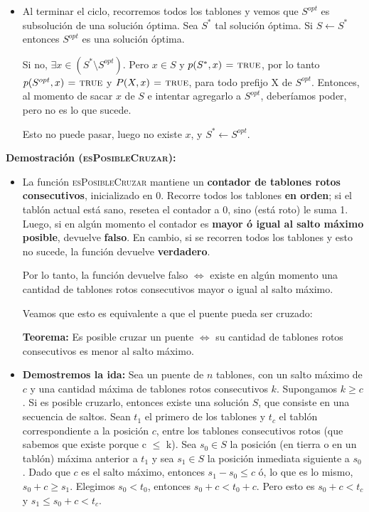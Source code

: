 \begin{itemize}
\begin{itemize}
    \item Al terminar el ciclo, recorremos todos los tablones y vemos que $S^{opt}$
    es subsolución de una solución óptima. Sea $S^{*}$ tal solución óptima.
    Si $S \gets S^{*}$ entonces $S^{opt}$ es una solución óptima.

    Si no, $\exists x \in (S^{*} \setminus S^{opt})$. Pero $x \in S$ y $p(S^{*}, x) \mathrel{\hspace{1pt}=\hspace{1pt}} \textnormal{\scshape true}$,
    por lo tanto $p(S^{opt}, x) \mathrel{\hspace{1pt}=\hspace{1pt}} \textnormal{\scshape true}$ y $P(X, x) \mathrel{\hspace{1pt}=\hspace{1pt}} \textnormal{\scshape true}$, para todo prefijo
    X de $S^{opt}$. Entonces, al momento de sacar $x$ de $S$ e intentar agregarlo a $S^{opt}$,
    deberíamos poder, pero no es lo que sucede.

    Esto no puede pasar, luego no existe $x$, y $S^{*} \gets S^{opt}$.

  \end{itemize}

\newpage

\textbf{Demostración (\textsc{esPosibleCruzar}):}
\begin{itemize}
\item La función \textsc{esPosibleCruzar} mantiene un \textbf{contador de tablones rotos consecutivos},
inicializado en 0. Recorre todos los tablones \textbf{en orden}; si el tablón actual
está sano, resetea el contador a 0, sino (está roto) le suma 1.
Luego, si en algún momento el contador es \textbf{mayor ó igual al salto máximo posible},
devuelve \textbf{falso}. En cambio, si se recorren todos los tablones y esto no sucede,
la función devuelve \textbf{verdadero}.

Por lo tanto, la función devuelve falso $\iff$ existe en algún momento una
cantidad de tablones rotos consecutivos mayor o igual al salto máximo.

Veamos que esto es equivalente a que el puente pueda ser cruzado: \medskip

\textbf{Teorema:} Es posible cruzar un puente $\iff$ su cantidad de tablones rotos
consecutivos es menor al salto máximo. \medskip

\item \textbf{Demostremos la ida:}
Sea un puente de $n$ tablones, con un salto máximo de $c$ y una cantidad máxima de
tablones rotos consecutivos $k$.
Supongamos $k \geq c$.
Si es posible cruzarlo, entonces existe una solución $S$, que consiste en una
secuencia de saltos.
Sean $t_1$ el primero de los tablones y $t_c$ el tablón correspondiente a la posición $c$, entre
los tablones consecutivos rotos (que sabemos que existe porque c $\leq$ k).
Sea $s_0 \in S$ la posición (en tierra o en un tablón) máxima anterior a $t_1$ y sea $s_1 \in S$
la posición inmediata siguiente a $s_0$.
Dado que $c$ es el salto máximo, entonces $s_1 - s_0 \leq c$ ó, lo que es lo
mismo, $s_0 + c \geq s_1$.
Elegimos $s_0 < t_0$, entonces $s_0 + c < t_0 + c$.
Pero esto es $s_0 + c < t_c$ y $s_1 \leq s_0 + c < t_c$.


\end{itemize}
\end{itemize}
